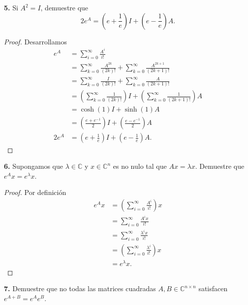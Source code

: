 \documentclass{article}
\newenvironment{statement}[1]{\smallskip\noindent\color[rgb]{1.00,0.00,0.50} {\bf #1.}}{}
\theoremstyle{definition}
\theoremstyle{remark}
\newcommand{\BC}{\mathbb C}
\begin{document}
\begin{statement}{5}
  Si $A^2 = I$, demuestre que
  \[
    2 e^A = (e + \frac{1}{e}) I + (e - \frac{1}{e}) A.
  \]
\end{statement}

\begin{proof}
  Desarrollamos
  \begin{align*}
    e^A &= \sum_{i = 0}^{\infty} \frac{A^i}{i!}\\
    &= \sum_{k = 0}^{\infty} \frac{A^{2k}}{(2k)!} + \sum_{k = 0}^{\infty} \frac{A^{2k + 1}}{(2k + 1)!}\\
    &= \sum_{k = 0}^{\infty} \frac{I}{(2k)!} + \sum_{k = 0}^{\infty} \frac{A}{(2k + 1)!}\\
    &= \left(\sum_{k = 0}^{\infty} \frac{1}{(2k)!}\right) I + \left(\sum_{k = 0}^{\infty} \frac{1}{(2k + 1)!}\right) A\\
    &= \cosh(1) I + \sinh(1) A\\
    &= \left(\frac{e + e^{-1}}{2}\right) I + \left(\frac{e - e^{-1}}{2}\right) A\\
    2 e^A &= \left(e + \frac{1}{e}\right) I + \left(e - \frac{1}{e}\right) A.
  \end{align*}
\end{proof}

\begin{statement}{6}
  Supongamos que $\lambda \in \BC$ y $x \in \BC^n$ es no nulo tal que $Ax = \lambda x$.
  Demuestre que $e^A x = e^{\lambda} x$.
\end{statement}

\begin{proof}
  Por definici\'on
  \begin{align*}
    e^A x &= \left(\sum_{i = 0}^{\infty} \frac{A^i}{i!}\right) x\\
    &= \sum_{i = 0}^{\infty} \frac{A^i x}{i!}\\
    &= \sum_{i = 0}^{\infty} \frac{\lambda^i x}{i!}\\
    &= \left(\sum_{i = 0}^{\infty} \frac{\lambda^i}{i!}\right) x\\
    &= e^{\lambda} x.
  \end{align*}
\end{proof}

\begin{statement}{7}
  Demuestre que no todas las matrices cuadradas $A, B \in \BC^{n \times n}$
  satisfacen $e^{A + B} = e^A e^B$.
\end{statement}
\end{document}
